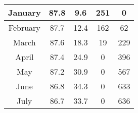\documentclass[conference]{IEEEtran}
\begin{document}
\begin{table}[!]
\begin{tabular}{|ccccc|}
\multicolumn{1}{|c|}{January}   & \multicolumn{1}{c|}{87.8}                                                           & \multicolumn{1}{c|}{9.6}                                                          & \multicolumn{1}{c|}{251}                                                      & 0                                                                \\ \hline
\multicolumn{1}{|c|}{February}  & \multicolumn{1}{c|}{87.7}                                                           & \multicolumn{1}{c|}{12.4}                                                         & \multicolumn{1}{c|}{162}                                                      & 62                                                               \\ \hline
\multicolumn{1}{|c|}{March}     & \multicolumn{1}{c|}{87.6}                                                           & \multicolumn{1}{c|}{18.3}                                                         & \multicolumn{1}{c|}{19}                                                       & 229                                                              \\ \hline
\multicolumn{1}{|c|}{April}     & \multicolumn{1}{c|}{87.4}                                                           & \multicolumn{1}{c|}{24.9}                                                         & \multicolumn{1}{c|}{0}                                                        & 396                                                              \\ \hline
\multicolumn{1}{|c|}{May}       & \multicolumn{1}{c|}{87.2}                                                           & \multicolumn{1}{c|}{30.9}                                                         & \multicolumn{1}{c|}{0}                                                        & 567                                                              \\ \hline
\multicolumn{1}{|c|}{June}      & \multicolumn{1}{c|}{86.8}                                                           & \multicolumn{1}{c|}{34.3}                                                         & \multicolumn{1}{c|}{0}                                                        & 633                                                              \\ \hline
\multicolumn{1}{|c|}{July}      & \multicolumn{1}{c|}{86.7}                                                           & \multicolumn{1}{c|}{33.7}                                                         & \multicolumn{1}{c|}{0}                                                        & 636                                                              \\ \hline

\end{tabular}
\end{table}
\end{document}
